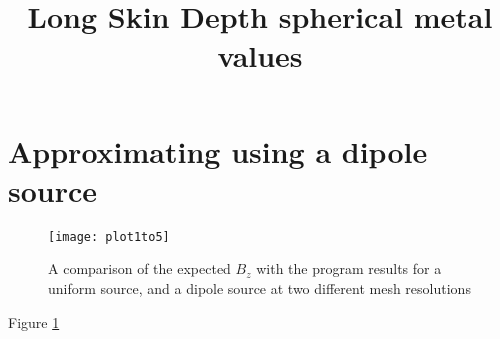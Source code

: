 \documentclass[11pt]{article}
\title{Long Skin Depth spherical metal values}
\date{}
\author{}
\begin{document}
\graphicspath{{figures/}}

\maketitle

\section{Approximating using a dipole source}
\begin{figure}[htp]
	\centering
	\texttt{[image: plot1to5]}
	\caption{A comparison of the expected ${B_z}$ with the program results for a uniform source, and a dipole source at two different mesh resolutions \label{fig:plotx1to5}}
\end{figure}

Figure \ref{fig:plotx1to5} 
\end{document}
